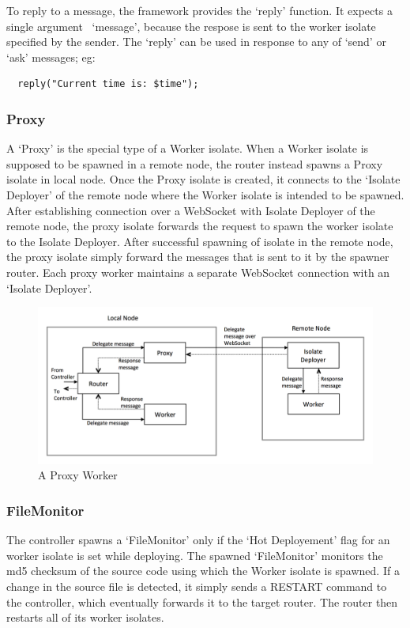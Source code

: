   To reply to a message, the framework provides the ‘reply’ function. It expects a single argument~\textemdash{} ‘message’, because the respose is sent to the worker isolate specified by the sender. The ‘reply’ can be used in response to any of ‘send’ or ‘ask’ messages; eg:
\begin{lstlisting}
  reply("Current time is: $time");
\end{lstlisting}

  \subsubsection{Proxy}
  A ‘Proxy’ is the special type of a Worker isolate. When a Worker isolate is supposed to be spawned in a remote node, the router instead spawns a Proxy isolate in local node. Once the Proxy isolate is created, it connects to the ‘Isolate Deployer’ of the remote node where the Worker isolate is intended to be spawned. After establishing connection over a WebSocket with Isolate Deployer of the remote node, the proxy isolate forwards the request to spawn the worker isolate to the Isolate Deployer. After successful spawning of isolate in the remote node, the proxy isolate simply forward the messages that is sent to it by the spawner router. Each proxy worker maintains a separate WebSocket connection with an ‘Isolate Deployer’.\\

  \begin{figure}[H]
    \centering
    \includegraphics[width=1\textwidth]{figures/proxy}
    \caption[Proxy Worker]{A Proxy Worker}
    \label{fig:proxy}
  \end{figure}

  \subsubsection{FileMonitor}
  \label{subsubsec:fileMonitor}
  The controller spawns a ‘FileMonitor’ only if the ‘Hot Deployement’ flag for an worker isolate is set while deploying. The spawned ‘FileMonitor’ monitors the md5 checksum of the source code using which the Worker isolate is spawned. If a change in the source file is detected, it simply sends a RESTART command to the controller, which eventually forwards it to the target router. The router then restarts all of its worker isolates.

